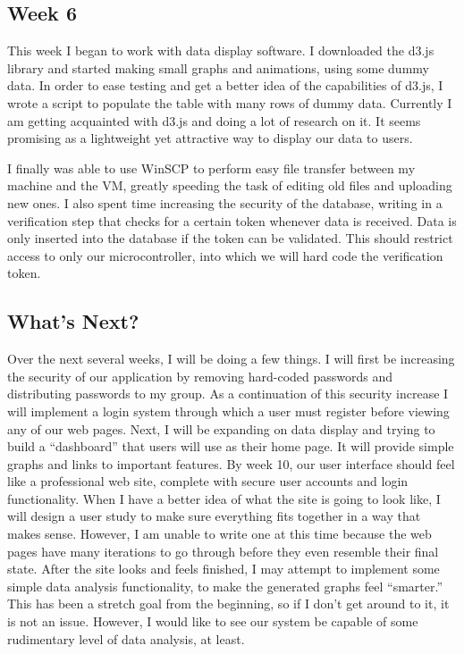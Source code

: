 \documentclass[IEEEtran,letterpaper,10pt,titlepage,fleqn,draftclsnofoot,onecolumn]{article}
\begin{document}
\subsection{Week 6}

This week I began to work with data display software. I downloaded the d3.js library and started making small graphs and animations, using some dummy data. In order to ease testing and get a better idea of the capabilities of d3.js, I wrote a script to populate the table with many rows of dummy data. Currently I am getting acquainted with d3.js and doing a lot of research on it. It seems promising as a lightweight yet attractive way to display our data to users.

I finally was able to use WinSCP to perform easy file transfer between my machine and the VM, greatly speeding the task of editing old files and uploading new ones. I also spent time increasing the security of the database, writing in a verification step that checks for a certain token whenever data is received. Data is only inserted into the database if the token can be validated. This should restrict access to only our microcontroller, into which we will hard code the verification token. 

\subsection{What's Next?}

Over the next several weeks, I will be doing a few things. I will first be increasing the security of our application by removing hard-coded passwords and distributing passwords to my group. As a continuation of this security increase I will implement a login system through which a user must register before viewing any of our web pages. Next, I will be expanding on data display and trying to build a “dashboard” that users will use as their home page. It will provide simple graphs and links to important features. By week 10, our user interface should feel like a professional web site, complete with secure user accounts and login functionality. When I have a better idea of what the site is going to look like, I will design a user study to make sure everything fits together in a way that makes sense. However, I am unable to write one at this time because the web pages have many iterations to go through before they even resemble their final state. After the site looks and feels finished, I may attempt to implement some simple data analysis functionality, to make the generated graphs feel “smarter.” This has been a stretch goal from the beginning, so if I don’t get around to it, it is not an issue. However, I would like to see our system be capable of some rudimentary level of data analysis, at least. 
\end{document}

